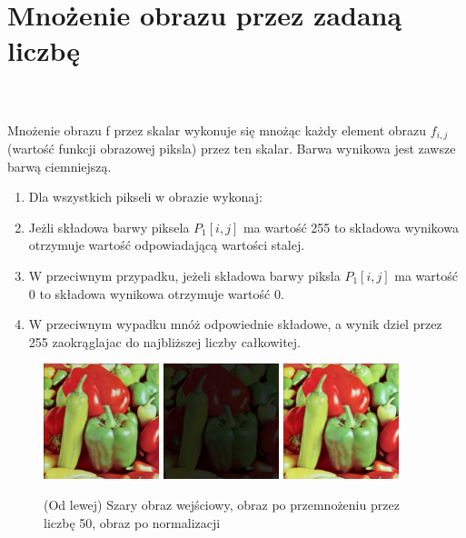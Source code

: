 \documentclass[final,a4paper,openany,12pt]{mwbk}
\begin{document}
\section {Mnożenie obrazu przez zadaną liczbę}
\hfill
\\\\
\indent
Mnożenie obrazu f przez skalar wykonuje się mnożąc każdy element obrazu $f_{i,j}$ (wartość funkcji obrazowej piksla) przez ten skalar. Barwa wynikowa jest zawsze barwą ciemniejszą.

\begin{enumerate}
		\item Dla wszystkich pikseli w obrazie wykonaj:
		\item Jeżli składowa barwy piksela $P_{1}[i,j]$ ma wartość 255 to składowa wynikowa otrzymuje wartość odpowiadającą wartości stalej.
		\item W przeciwnym przypadku, jeżeli składowa barwy piksla $P_{1}[i,j]$ ma wartość 0 to składowa wynikowa otrzymuje wartość 0.
		\item W przeciwnym wypadku mnóż odpowiednie składowe, a wynik dziel przez 255 zaokrąglajac do najbliższej liczby całkowitej.
	\end{enumerate}

\begin{figure}[H]
	\begin{center}
		\includegraphics[width=0.3\textwidth]{1/1Color_Const_Multipl_Original}
		\includegraphics[width=0.3\textwidth]{1/1Color_Const_Multipl_Result}
		\includegraphics[width=0.3\textwidth]{1/1Color_Const_Multipl_Result_Norm}
	\end{center}
	\caption{(Od lewej) Szary obraz wejściowy, obraz po przemnożeniu przez liczbę 50, obraz po normalizacji }
\end{figure}
\end{document}
